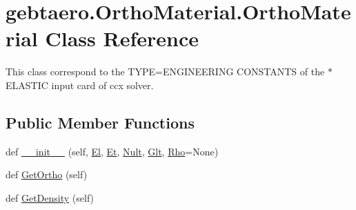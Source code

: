 \hypertarget{classgebtaero_1_1_ortho_material_1_1_ortho_material}{}\section{gebtaero.\+Ortho\+Material.\+Ortho\+Material Class Reference}
\label{classgebtaero_1_1_ortho_material_1_1_ortho_material}


This class correspond to the T\+Y\+PE=E\+N\+G\+I\+N\+E\+E\+R\+I\+NG C\+O\+N\+S\+T\+A\+N\+TS of the $\ast$\+E\+L\+A\+S\+T\+IC input card of ccx solver.  


\subsection*{Public Member Functions}
\begin{DoxyCompactItemize}
\item 
def \hyperlink{classgebtaero_1_1_ortho_material_1_1_ortho_material_a373dc6b920e8cebeb15f2ba465094c5e}{\+\_\+\+\_\+init\+\_\+\+\_\+} (self, \hyperlink{classgebtaero_1_1_ortho_material_1_1_ortho_material_a06886fe27a343441b7c49bf57ada36c2}{El}, \hyperlink{classgebtaero_1_1_ortho_material_1_1_ortho_material_a7c51660a08aa851b73bba6a7e0457be8}{Et}, \hyperlink{classgebtaero_1_1_ortho_material_1_1_ortho_material_adcae0796a5742c9467e24fe7370e6c32}{Nult}, \hyperlink{classgebtaero_1_1_ortho_material_1_1_ortho_material_a0caf3d15efa1fef5bafed6e6c8d7a5b3}{Glt}, \hyperlink{classgebtaero_1_1_ortho_material_1_1_ortho_material_aa1fa00a17cf09210c0daf5d7bbd07d0d}{Rho}=None)
\item 
def \hyperlink{classgebtaero_1_1_ortho_material_1_1_ortho_material_a281c7c6ffe7db16e3a27c7bfb5b14e3a}{Get\+Ortho} (self)
\item 
def \hyperlink{classgebtaero_1_1_ortho_material_1_1_ortho_material_a803f61a2e841734af169ac4ad4895605}{Get\+Density} (self)
\end{DoxyCompactItemize}
